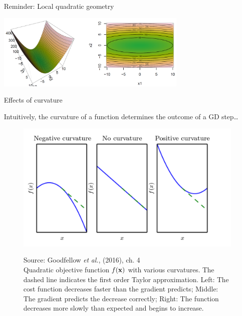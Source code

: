 \documentclass[11pt,compress,t,notes=noshow, xcolor=table]{beamer}
\begin{document}
\begin{vbframe}{Reminder: Local quadratic geometry}
	\begin{center}
		\includegraphics[width=0.7\textwidth]{figure_man/ill-con.png}
	\end{center}

\end{vbframe}


\begin{frame} {Effects of curvature}

	Intuitively, the curvature of a function determines the outcome of a GD step\dots
	
	\vspace*{-0.5cm}
	\begin{figure}
		\begin{center}
			\includegraphics[width=.7\textwidth]{figure_man/curvature.png}
		\end{center}
		\tiny{Source: Goodfellow \emph{et al.}, (2016), ch. 4} \\
		\footnotesize{Quadratic objective function $f(\mathbf{x})$ with various curvatures.
			The dashed line indicates the first order Taylor approximation. Left: The cost function decreases faster than the gradient predicts; Middle: The gradient predicts the decrease correctly; Right: The function decreases more slowly than expected and begins to increase. }
	\end{figure}
\end{frame}


	
\end{document}
